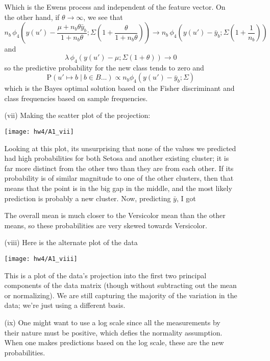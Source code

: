 \documentclass[11pt]{article}
\newcommand{\p}{\mathrm{P}}
\newcommand{\st}{ \; \big | \:}
\theoremstyle{definition}
\begin{document}
\begin{itemize}
\begin{itemize}
                Which is the Ewens process and independent of the feature vector. On the other hand, if $\theta\to\infty$, we see that
                \[ n_b\, \phi_4\!\left(y(u') - \frac{\mu+n_b\theta \bar y_b}{1+n_b\theta};\Sigma\left(1+\frac{\theta}{1+n_b\theta}\right)\right) \to n_b\, \phi_4\!\left(y(u') - \bar y_b;\Sigma\left(1+\frac{1}{n_b}\right)\right) \]
                and 
                \[ \lambda\, \phi_4\!\left(y(u') - \mu;\Sigma\left(1+\theta\right)\right) \to 0 \]
                so the predictive probability for the new class tends to zero and 
                \[ \p(u' \mapsto b \st b\in B ...) \propto n_b\phi_4\!\left(y(u') - \bar y_b;\Sigma\right) \]
                which is the Bayes optimal solution based on the Fisher discriminant and class frequencies based on sample frequencies. 
            \item[(vii)]
                Making the scatter plot of the projection:
                \begin{center}
                    \texttt{[image: hw4/A1\_vii]} 
                \end{center}
                Looking at this plot, its unsurprising that none of the values we predicted had high probabilities for both Setosa and another existing cluster; it is far more distinct from the other two than they are from each other. If its probability is of similar magnitude to one of the other clusters, then that means that the point is in the big gap in the middle, and the most likely prediction is probably a new cluster. Now, predicting $\bar y$, I got 
                \FloatBarrier
                
                \FloatBarrier
                The overall mean is much closer to the Versicolor mean than the other means, so these probabilities are very skewed towards Versicolor.
            \item[(viii)]
                Here is the alternate plot of the data
                \begin{center}
                    \texttt{[image: hw4/A1\_viii]} 
                \end{center}
                This is a plot of the data's projection into the first two principal components of the data matrix (though without subtracting out the mean or normalizing). We are still capturing the majority of the variation in the data; we're just using a different basis.
            \item[(ix)]
                One might want to use a log scale since all the measurements by their nature must be positive, which defies the normality assumption. When one makes predictions based on the log scale, these are the new probabilities.

\end{itemize}
\end{itemize}
\end{document}
